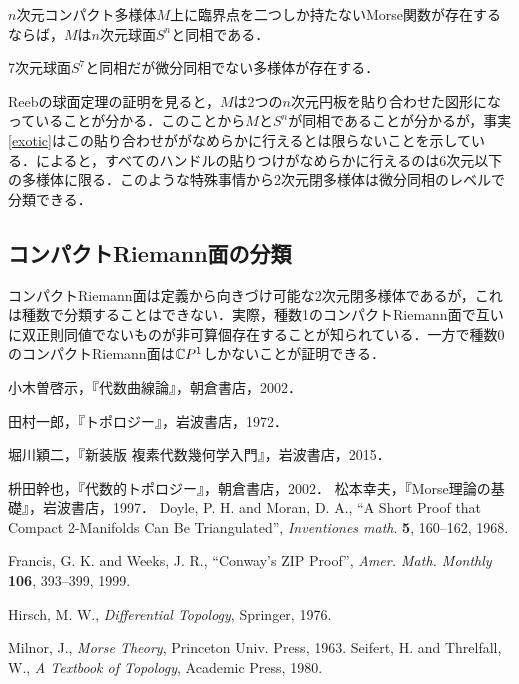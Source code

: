 \documentclass[dvipdfmx,uplatex]{jsarticle}
\begin{document}
\begin{fact}[Reebの球面定理]
$n$次元コンパクト多様体$M$上に臨界点を二つしか持たないMorse関数が存在するならば，$M$は$n$次元球面$S^n$と同相である．
\end{fact}

\begin{fact}[Milnorのエキゾチック球面]\label{exotic}
7次元球面$S^7$と同相だが微分同相でない多様体が存在する．
\end{fact}

Reebの球面定理の証明を見ると，$M$は2つの$n$次元円板を貼り合わせた図形になっていることが分かる．このことから$M$と$S^n$が同相であることが分かるが，事実\ref{exotic}はこの貼り合わせががなめらかに行えるとは限らないことを示している．\cite{松本}によると，すべてのハンドルの貼りつけがなめらかに行えるのは6次元以下の多様体に限る．このような特殊事情から2次元閉多様体は微分同相のレベルで分類できる．

\subsection{コンパクトRiemann面の分類}
コンパクトRiemann面は定義から向きづけ可能な2次元閉多様体であるが，これは種数で分類することはできない．実際，種数1のコンパクトRiemann面で互いに双正則同値でないものが非可算個存在することが知られている．一方で種数0のコンパクトRiemann面は$\mathbb{C} P^1$しかないことが証明できる．

\begin{thebibliography}{99}
\item 小木曽啓示，『代数曲線論』，朝倉書店，2002．
\item 田村一郎，『トポロジー』，岩波書店，1972．
\item 堀川穎二，『新装版 複素代数幾何学入門』，岩波書店，2015．
\item 枡田幹也，『代数的トポロジー』，朝倉書店，2002．
 松本幸夫，『Morse理論の基礎』，岩波書店，1997．
 Doyle, P. H. and Moran, D. A., ``A Short Proof that Compact 2-Manifolds Can Be Triangulated'', \textit{Inventiones math}. \textbf{5}, 160--162, 1968.
\item Francis, G. K. and Weeks, J. R., ``Conway's ZIP Proof'', \textit{Amer. Math. Monthly} \textbf{106}, 393--399, 1999.
\item Hirsch, M. W., \textit{Differential Topology}, Springer, 1976.
\item Milnor, J., \textit{Morse Theory}, Princeton Univ. Press, 1963. 
 Seifert, H. and Threlfall, W., \textit{A Textbook of Topology}, Academic Press, 1980. 
\end{thebibliography}
\end{document}

